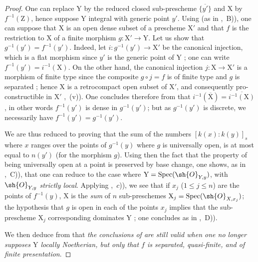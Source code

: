 \begin{proof}
One can replace $\mathrm{Y}$ by the reduced closed sub-prescheme $\overline{\{y'\}}$ and $\mathrm{X}$ by $f^{-1}(\mathrm{Z})$, hence suppose $\mathrm{Y}$ integral with generic point $y'$.
Using  (as in ,~B)), one can suppose that $\mathrm{X}$ is an open dense subset of a prescheme $\mathrm{X}'$ and that $f$ is the restriction to $\mathrm{X}$ of a finite morphism $g:\mathrm{X}'\to\mathrm{Y}$.
Let us show that $g^{-1}(y')=f^{-1}(y')$.
Indeed, let $i:g^{-1}(y')\to\mathrm{X}'$ be the canonical injection, which is a flat morphism since $y'$ is the generic point of $\mathrm{Y}$ ; one can write $f^{-1}(y')=i^{-1}(\mathrm{X})$.
On the other hand, the canonical injection $j:\mathrm{X}\to\mathrm{X}'$ is a morphism of finite type since the composite $g\circ j=f$ is of finite type and $g$ is separated ; hence $\mathrm{X}$ is a retrocompact open subset of $\mathrm{X}'$, and consequently pro-constructible in $\mathrm{X}'$ ,~(v)).
One concludes therefore from  that $i^{-1}(\overline{\mathrm{X}})=\overline{i^{-1}(\mathrm{X})}$, in other words $f^{-1}(y')$ is dense in $g^{-1}(y')$; but as $g^{-1}(y')$ is discrete, we necessarily have $f^{-1}(y')=g^{-1}(y')$.

We are thus reduced to proving that the sum of the numbers $[k(x):k(y)]_s$ where $x$ ranges over the points of $g^{-1}(y)$ where $g$ is universally open, is at most equal to
$n(y')$ (for the morphism $g$).
Using then the fact that the property of being universally open at a point is preserved by base change, one shows, as in ,~C)), that one can reduce to the case where $\mathrm{Y}=\operatorname{Spec}(\sh{O}_{Y,y})$, with $\sh{O}_{Y,y}$ \emph{strictly local}.
Applying ,~$c$)), we see that if $x_j$ ($1\leq j\leq n$) are the points of $f^{-1}(y)$, $\mathrm{X}$ is the \emph{sum} of $n$ sub-preschemes $\mathrm{X}_j=\operatorname{Spec}(\sh{O}_{X,x_j})$; the hypothesis that $g$ is open in each of the points $x_j$ implies that the sub-prescheme $\mathrm{X}_j$ corresponding dominates $\mathrm{Y}$ ; one concludes as in ,~D)).

We then deduce from  that \emph{the conclusions of  are still valid when one no longer supposes $\mathrm{Y}$ locally Noetherian, but only that $f$ is separated, quasi-finite, and of finite presentation}.
\end{proof}

